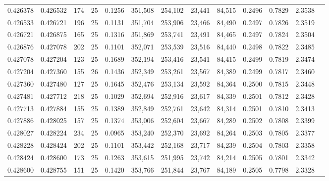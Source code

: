 \begin{tabular}{rrrrrrrrrrrrr}
0.426378 & 0.426532 &   174 &  25 &                                     0.1256 & 351,508 & 254,102 &  23,441 &  84,515 & 0.2496 & 0.7829 & 2.3538 \\
0.426533 & 0.426721 &   196 &  25 &                                     0.1131 & 351,704 & 253,906 &  23,466 &  84,490 & 0.2497 & 0.7826 & 2.3519 \\
0.426721 & 0.426875 &   165 &  25 &                                     0.1316 & 351,869 & 253,741 &  23,491 &  84,465 & 0.2497 & 0.7824 & 2.3504 \\
0.426876 & 0.427078 &   202 &  25 &                                     0.1101 & 352,071 & 253,539 &  23,516 &  84,440 & 0.2498 & 0.7822 & 2.3485 \\
0.427078 & 0.427204 &   123 &  25 &                                     0.1689 & 352,194 & 253,416 &  23,541 &  84,415 & 0.2499 & 0.7819 & 2.3474 \\
0.427204 & 0.427360 &   155 &  26 &                                     0.1436 & 352,349 & 253,261 &  23,567 &  84,389 & 0.2499 & 0.7817 & 2.3460 \\
0.427360 & 0.427480 &   127 &  25 &                                     0.1645 & 352,476 & 253,134 &  23,592 &  84,364 & 0.2500 & 0.7815 & 2.3448 \\
0.427481 & 0.427712 &   218 &  25 &                                     0.1029 & 352,694 & 252,916 &  23,617 &  84,339 & 0.2501 & 0.7812 & 2.3428 \\
0.427713 & 0.427884 &   155 &  25 &                                     0.1389 & 352,849 & 252,761 &  23,642 &  84,314 & 0.2501 & 0.7810 & 2.3413 \\
0.427886 & 0.428025 &   157 &  25 &                                     0.1374 & 353,006 & 252,604 &  23,667 &  84,289 & 0.2502 & 0.7808 & 2.3399 \\
0.428027 & 0.428224 &   234 &  25 &                                     0.0965 & 353,240 & 252,370 &  23,692 &  84,264 & 0.2503 & 0.7805 & 2.3377 \\
0.428228 & 0.428424 &   202 &  25 &                                     0.1101 & 353,442 & 252,168 &  23,717 &  84,239 & 0.2504 & 0.7803 & 2.3358 \\
0.428424 & 0.428600 &   173 &  25 &                                     0.1263 & 353,615 & 251,995 &  23,742 &  84,214 & 0.2505 & 0.7801 & 2.3342 \\
0.428600 & 0.428755 &   151 &  25 &                                     0.1420 & 353,766 & 251,844 &  23,767 &  84,189 & 0.2505 & 0.7798 & 2.3328 \\

\end{tabular}

